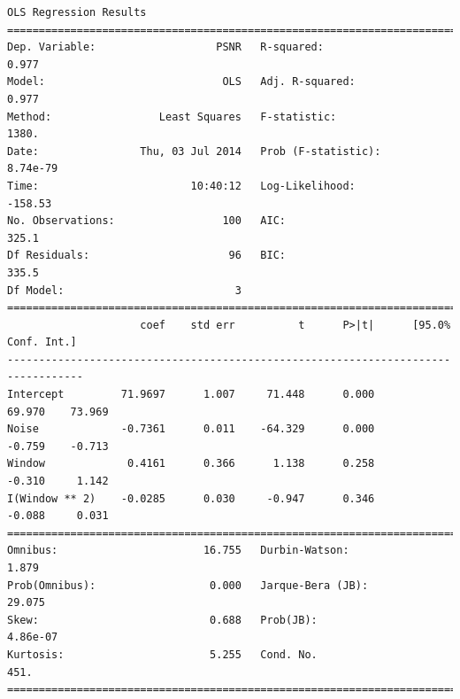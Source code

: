 \documentclass[11pt]{article}
\theoremstyle{definition}
\begin{document}
{\begin{lstlisting}[caption = Time Series 2 - Box Filter OLS Model, label = {boxfilterseries2}]
                            OLS Regression Results                            
==============================================================================
Dep. Variable:                   PSNR   R-squared:                       0.977
Model:                            OLS   Adj. R-squared:                  0.977
Method:                 Least Squares   F-statistic:                     1380.
Date:                Thu, 03 Jul 2014   Prob (F-statistic):           8.74e-79
Time:                        10:40:12   Log-Likelihood:                -158.53
No. Observations:                 100   AIC:                             325.1
Df Residuals:                      96   BIC:                             335.5
Df Model:                           3                                         
==================================================================================
                     coef    std err          t      P>|t|      [95.0% Conf. Int.]
----------------------------------------------------------------------------------
Intercept         71.9697      1.007     71.448      0.000        69.970    73.969
Noise             -0.7361      0.011    -64.329      0.000        -0.759    -0.713
Window             0.4161      0.366      1.138      0.258        -0.310     1.142
I(Window ** 2)    -0.0285      0.030     -0.947      0.346        -0.088     0.031
==============================================================================
Omnibus:                       16.755   Durbin-Watson:                   1.879
Prob(Omnibus):                  0.000   Jarque-Bera (JB):               29.075
Skew:                           0.688   Prob(JB):                     4.86e-07
Kurtosis:                       5.255   Cond. No.                         451.
==============================================================================
\end{lstlisting}

}
\end{document}
